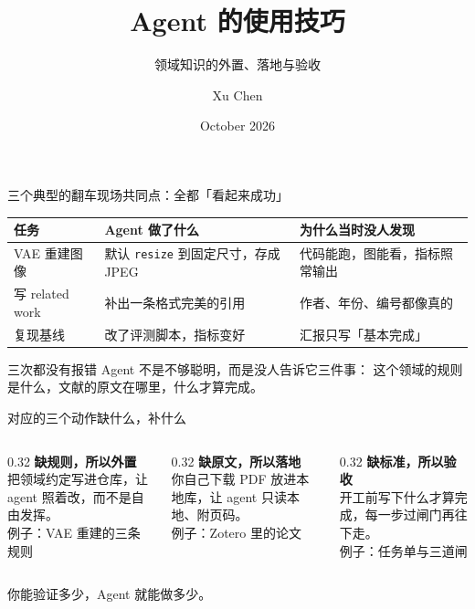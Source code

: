 \documentclass[aspectratio=169]{beamer}
\title[Agent 的使用技巧]{Agent 的使用技巧}
\subtitle{领域知识的外置、落地与验收}
\author[Xu Chen]{Xu Chen}
\date{October 2026}
\begin{document}
\begin{frame}
  \titlepage
\end{frame}

\begin{frame}{三个典型的翻车现场}{共同点：全都「看起来成功」}
  \begin{center}
  \footnotesize
  \begin{tabular}{lll}
    \toprule
    \textbf{任务} & \textbf{Agent 做了什么} & \textbf{为什么当时没人发现} \\
    \midrule
    VAE 重建图像 & 默认 \texttt{resize} 到固定尺寸，存成 JPEG & 代码能跑，图能看，指标照常输出 \\
    写 related work & 补出一条格式完美的引用 & 作者、年份、编号都像真的 \\
    复现基线 & 改了评测脚本，指标变好 & 汇报只写「基本完成」 \\
    \bottomrule
  \end{tabular}
  \end{center}
  \bigskip
  \begin{block}{三次都没有报错}
    Agent 不是不够聪明，而是没人告诉它三件事：
    这个领域的规则是什么，文献的原文在哪里，什么才算完成。
  \end{block}
\end{frame}

\begin{frame}{对应的三个动作}{缺什么，补什么}
  \begin{columns}[T]
    \begin{column}{0.32\textwidth}
      \textcolor{sig}{\textbf{缺规则，所以外置}}\\[4pt]
      \small 把领域约定写进仓库，让 agent 照着改，而不是自由发挥。\\[4pt]
      \textcolor{soft}{\small 例子：VAE 重建的三条规则}
    \end{column}
    \begin{column}{0.32\textwidth}
      \textcolor{accent}{\textbf{缺原文，所以落地}}\\[4pt]
      \small 你自己下载 PDF 放进本地库，让 agent 只读本地、附页码。\\[4pt]
      \textcolor{soft}{\small 例子：Zotero 里的论文}
    \end{column}
    \begin{column}{0.32\textwidth}
      \textcolor{video}{\textbf{缺标准，所以验收}}\\[4pt]
      \small 开工前写下什么才算完成，每一步过闸门再往下走。\\[4pt]
      \textcolor{soft}{\small 例子：任务单与三道闸}
    \end{column}
  \end{columns}
  \bigskip
  \begin{center}
  {\Large 你能验证多少，Agent 就能做多少。}
  \end{center}
\end{frame}
\end{document}

